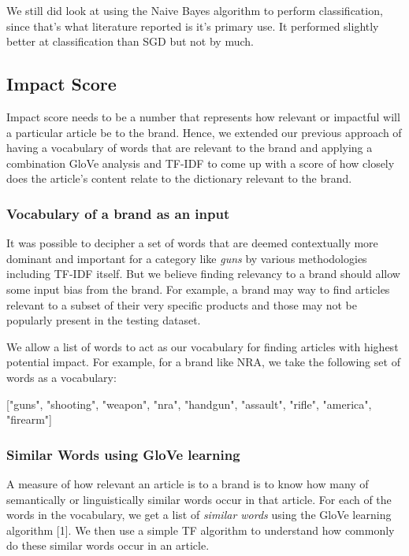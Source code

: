 \documentclass{article}
\begin{document}
We still did look at using the Naive Bayes algorithm to perform classification, since that's what literature reported is it's primary use. It performed slightly better at classification than SGD but not by much.

\subsection {Impact Score}
Impact score needs to be a number that represents how relevant or impactful will a particular article be to the brand. Hence, we extended our previous approach of having a vocabulary of words that are relevant to the brand and applying a combination GloVe analysis and TF-IDF to come up with a score of how closely does the article's content relate to the dictionary relevant to the brand.

\subsubsection {Vocabulary of a brand as an input}
It was possible to decipher a set of words that are deemed contextually more dominant and important for a category like \textit{guns} by various methodologies including TF-IDF itself. But we believe finding relevancy to a brand should allow some input bias from the brand. For example, a brand may way to find articles relevant to a subset of their very specific products and those may not be popularly present in the testing dataset. 

We allow a list of words to act as our vocabulary for finding articles with highest potential impact. For example, for a brand like NRA, we take the following set of words as a vocabulary:
\begin{center}
["guns", "shooting", "weapon", "nra", "handgun", "assault", "rifle", "america", "firearm"]
\end {center}

\subsubsection {Similar Words using GloVe learning}
A measure of how relevant an article is to a brand is to know how many of semantically or linguistically similar words occur in that article. For each of the words in the vocabulary, we get a list of \textit{similar words} using the GloVe learning algorithm [1]. We then use a simple TF algorithm to understand how commonly do these similar words occur in an article. 
\end{document}
